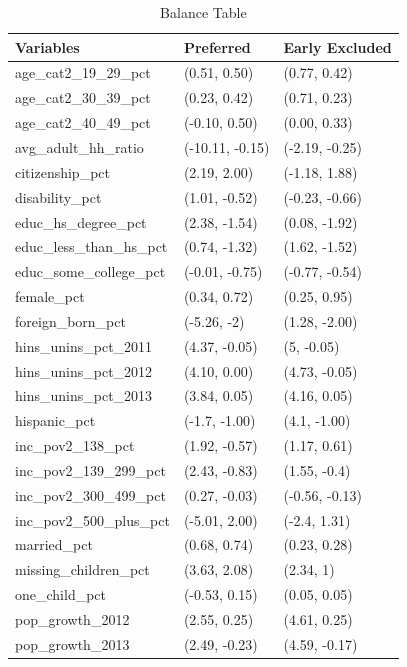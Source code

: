 \documentclass{article}
\begin{document}
\begin{appendix}
\begin{table}[ht]
\centering
    \caption{Balance Table}
    \label{tab:baltab1}
\begin{tabular}{lll}
  \hline
Variables & Preferred & Early Excluded \\ 
  \hline
age\_cat2\_19\_29\_pct & (0.51, 0.50) & (0.77, 0.42) \\ 
  age\_cat2\_30\_39\_pct & (0.23, 0.42) & (0.71, 0.23) \\ 
  age\_cat2\_40\_49\_pct & (-0.10, 0.50) & (0.00, 0.33) \\ 
  avg\_adult\_hh\_ratio & (-10.11, -0.15) & (-2.19, -0.25) \\ 
  citizenship\_pct & (2.19, 2.00) & (-1.18, 1.88) \\ 
  disability\_pct & (1.01, -0.52) & (-0.23, -0.66) \\ 
  educ\_hs\_degree\_pct & (2.38, -1.54) & (0.08, -1.92) \\ 
  educ\_less\_than\_hs\_pct & (0.74, -1.32) & (1.62, -1.52) \\ 
  educ\_some\_college\_pct & (-0.01, -0.75) & (-0.77, -0.54) \\ 
  female\_pct & (0.34, 0.72) & (0.25, 0.95) \\ 
  foreign\_born\_pct & (-5.26, -2) & (1.28, -2.00) \\ 
  hins\_unins\_pct\_2011 & (4.37, -0.05) & (5, -0.05) \\ 
  hins\_unins\_pct\_2012 & (4.10, 0.00) & (4.73, -0.05) \\ 
  hins\_unins\_pct\_2013 & (3.84, 0.05) & (4.16, 0.05) \\ 
  hispanic\_pct & (-1.7, -1.00) & (4.1, -1.00) \\ 
  inc\_pov2\_138\_pct & (1.92, -0.57) & (1.17, 0.61) \\ 
  inc\_pov2\_139\_299\_pct & (2.43, -0.83) & (1.55, -0.4) \\ 
  inc\_pov2\_300\_499\_pct & (0.27, -0.03) & (-0.56, -0.13) \\ 
  inc\_pov2\_500\_plus\_pct & (-5.01, 2.00) & (-2.4, 1.31) \\ 
  married\_pct & (0.68, 0.74) & (0.23, 0.28) \\ 
  missing\_children\_pct & (3.63, 2.08) & (2.34, 1) \\ 
  one\_child\_pct & (-0.53, 0.15) & (0.05, 0.05) \\ 
  pop\_growth\_2012 & (2.55, 0.25) & (4.61, 0.25) \\ 
  pop\_growth\_2013 & (2.49, -0.23) & (4.59, -0.17) \\ 

\end{tabular}
\end{table}
\end{appendix}
\end{document}
